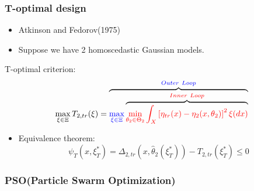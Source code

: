 \documentclass[xcolor=dvipsnames,aspectratio=1610]{beamer}
\begin{document}
\begin{frame}
\frametitle{T-optimal design}
\begin{itemize}
\item Atkinson and Fedorov(1975)
\item Suppose we have 2 homoscedastic Gaussian models.

\end{itemize}
T-optimal criterion:
$$\max_{\xi\in \Xi} T_{2,tr}(\xi)=\overbrace{\textcolor{blue}{\max_{\xi\in \Xi}} \overbrace{\textcolor{red}{\min_{\substack{\theta_2\in \Theta_2}}\int_{X}\left[\eta_{tr}(x)-\eta_2(x,\theta_2)\right]^2 \xi(dx)}}^{\textcolor{red}{Inner\ Loop}}}^{\textcolor{blue}{Outer\ Loop}}$$
\begin{itemize}
\item Equivalence theorem:
$$\psi_T(x,\xi_T^\ast)=\Delta_{2,tr}(x,\hat{\theta}_2(\xi_T^\ast))-T_{2,tr}(\xi_T^\ast)\leq 0$$
\end{itemize}
\end{frame}

\begin{frame}
\frametitle{PSO(Particle Swarm Optimization)}
\begin{figure}
\label{fig:PSO介紹-1}
\end{figure}
\begin{figure}
\label{fig:PSO介紹-2}
\end{figure}
\end{frame}
\end{document}

